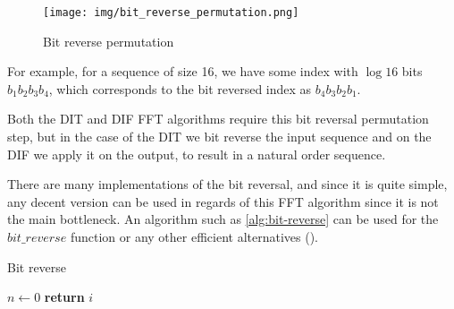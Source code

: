 \documentclass[
  oneside,
  11pt, a4paper,
  footinclude=true,
  headinclude=true,
  cleardoublepage=empty
]{scrbook}
\begin{document}
\begin{figure}[h] 
    \centering
    \texttt{[image: img/bit\_reverse\_permutation.png]}
    \caption{Bit reverse permutation}
    \label{fig:bit-reverse-permutation}
\end{figure}

For example, for a sequence of size 16, we have some index with $\log{16}$ bits $b_1 b_2 b_3 b_4$, which corresponds to the bit reversed index as $b_4 b_3 b_2 b_1$.

Both the DIT and DIF FFT algorithms require this bit reversal permutation step, but in the case of the DIT we bit reverse the input sequence and on the DIF we apply it on the output, to result in a natural order sequence.

There are many implementations of the bit reversal, and since it is quite simple, any decent version can be used in regards of this FFT algorithm since it is not the main bottleneck. An algorithm such as \autoref{alg:bit-reverse} can be used for the $bit\_reverse$ function or any other efficient alternatives (\cite{prado2004new}).
\newline 

\begin{algorithm}[H]
    \caption{Bit reverse} \label{alg:bit-reverse}

    $n \gets 0$
    \textbf{return} $i$\;
\end{algorithm}
\newline


\end{document}
